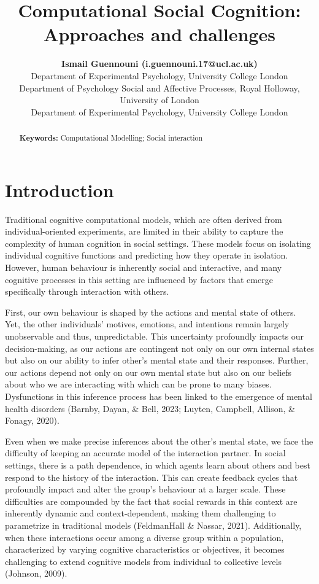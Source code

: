 \documentclass[10pt, letterpaper]{article}
\title{Computational Social Cognition: Approaches and challenges}
\author{{\large \bf Ismail Guennouni (i.guennouni.17@ucl.ac.uk)} \\ Department of Experimental Psychology, University College London \AND {\large \bf Joseph M Barnby (joseph.barnby@rhul.ac.uk} \\  Department of Psychology Social and Affective Processes, Royal Holloway, University of London \AND {\large \bf Maarten Speekenbrink (m.speekenbrink@ucl.ac.uk)} \\ Department of Experimental Psychology, University College London }
\begin{document}
\maketitle

\begin{abstract}


\textbf{Keywords:}
Computational Modelling; Social interaction
\end{abstract}

\hypertarget{introduction}{%
\section{Introduction}\label{introduction}}

Traditional cognitive computational models, which are often derived from
individual-oriented experiments, are limited in their ability to capture
the complexity of human cognition in social settings. These models focus
on isolating individual cognitive functions and predicting how they
operate in isolation. However, human behaviour is inherently social and
interactive, and many cognitive processes in this setting are influenced
by factors that emerge specifically through interaction with others.

First, our own behaviour is shaped by the actions and mental state of
others. Yet, the other individuals' motives, emotions, and intentions
remain largely unobservable and thus, unpredictable. This uncertainty
profoundly impacts our decision-making, as our actions are contingent
not only on our own internal states but also on our ability to infer
other's mental state and their responses. Further, our actions depend
not only on our own mental state but also on our beliefs about who we
are interacting with which can be prone to many biases. Dysfunctions in
this inference process has been linked to the emergence of mental health
disorders (Barnby, Dayan, \& Bell, 2023; Luyten, Campbell, Allison, \&
Fonagy, 2020).

Even when we make precise inferences about the other's mental state, we
face the difficulty of keeping an accurate model of the interaction
partner. In social settings, there is a path dependence, in which agents
learn about others and best respond to the history of the interaction.
This can create feedback cycles that profoundly impact and alter the
group's behaviour at a larger scale. These difficulties are compounded
by the fact that social rewards in this context are inherently dynamic
and context-dependent, making them challenging to parametrize in
traditional models (FeldmanHall \& Nassar, 2021). Additionally, when
these interactions occur among a diverse group within a population,
characterized by varying cognitive characteristics or objectives, it
becomes challenging to extend cognitive models from individual to
collective levels (Johnson, 2009).
\end{document}
